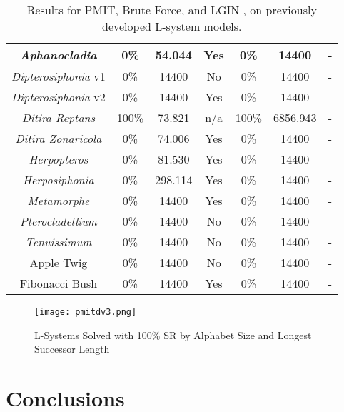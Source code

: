 \documentclass{llncs}
\begin{document}
\begin{table}[h!]
\begin{tabular}{|c||c|c|c||c|c||c|}
			\textit{Aphanocladia} \cite{algorithmicbotany}& 0\% & 54.044 & Yes & 0\% & 14400 & - \\ \hline
			\textit{Dipterosiphonia} v1 \cite{algorithmicbotany}& 0\% & 14400 & No & 0\% & 14400 & - \\ \hline
			\textit{Dipterosiphonia} v2 \cite{algorithmicbotany}& 0\% & 14400 & Yes & 0\% & 14400 & - \\ \hline
			\textit{Ditira Reptans} \cite{algorithmicbotany}& 100\% & 73.821 & n/a & 100\% & 6856.943 & - \\ \hline
			\textit{Ditira Zonaricola} \cite{algorithmicbotany}& 0\% & 74.006 & Yes & 0\% & 14400 & - \\ \hline
			\textit{Herpopteros} \cite{algorithmicbotany}& 0\% & 81.530 & Yes & 0\% & 14400 & - \\ \hline
			\textit{Herposiphonia} \cite{algorithmicbotany}& 0\% & 298.114 & Yes & 0\% & 14400 & - \\ \hline
			\textit{Metamorphe} \cite{algorithmicbotany}& 0\% & 14400 & Yes & 0\% & 14400 & - \\ \hline
			\textit{Pterocladellium} \cite{algorithmicbotany}& 0\% & 14400 & No & 0\% & 14400 & - \\ \hline
			\textit{Tenuissimum} \cite{algorithmicbotany}& 0\% & 14400 & No & 0\% & 14400 & - \\ \hline
			Apple Twig \cite{algorithmicbotany}& 0\% & 14400 & No & 0\% & 14400 & - \\ \hline
			Fibonacci Bush \cite{algorithmicbotany}& 0\% & 14400 & Yes & 0\% & 14400 & - \\ \hline
		\end{tabular}
		\caption{Results for PMIT, Brute Force, and LGIN \cite{nakano_inferD0Lerrorfree}, on previously developed L-system models.}
		\label{table:results1}
	\end{table}
	
	\begin{figure}[h!]
		\centering
		\texttt{[image: pmitdv3.png]}
		\caption{L-Systems Solved with 100\% SR by Alphabet Size and Longest Successor Length}
		\label{fig:2}
	\end{figure}
	
	\section{Conclusions}
	
\end{document}
